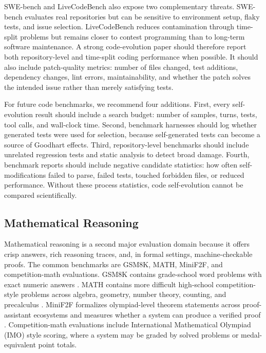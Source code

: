 SWE-bench and LiveCodeBench also expose two complementary threats. SWE-bench evaluates real repositories but can be sensitive to environment setup, flaky tests, and issue selection. LiveCodeBench reduces contamination through time-split problems but remains closer to contest programming than to long-term software maintenance. A strong code-evolution paper should therefore report both repository-level and time-split coding performance when possible. It should also include patch-quality metrics: number of files changed, test additions, dependency changes, lint errors, maintainability, and whether the patch solves the intended issue rather than merely satisfying tests.

For future code benchmarks, we recommend four additions. First, every self-evolution result should include a search budget: number of samples, turns, tests, tool calls, and wall-clock time. Second, benchmark harnesses should log whether generated tests were used for selection, because self-generated tests can become a source of Goodhart effects. Third, repository-level benchmarks should include unrelated regression tests and static analysis to detect broad damage. Fourth, benchmark reports should include negative candidate statistics: how often self-modifications failed to parse, failed tests, touched forbidden files, or reduced performance. Without these process statistics, code self-evolution cannot be compared scientifically.

\subsection{Mathematical Reasoning}
\label{subsec:mathematical-reasoning}

Mathematical reasoning is a second major evaluation domain because it offers crisp answers, rich reasoning traces, and, in formal settings, machine-checkable proofs. The common benchmarks are GSM8K, MATH, MiniF2F, and competition-math evaluations. GSM8K contains grade-school word problems with exact numeric answers \cite{gsm8k2021}. MATH contains more difficult high-school competition-style problems across algebra, geometry, number theory, counting, and precalculus \cite{math2021}. MiniF2F formalizes olympiad-level theorem statements across proof-assistant ecosystems and measures whether a system can produce a verified proof \cite{minif2f2021}. Competition-math evaluations include International Mathematical Olympiad (IMO) style scoring, where a system may be graded by solved problems or medal-equivalent point totals.

